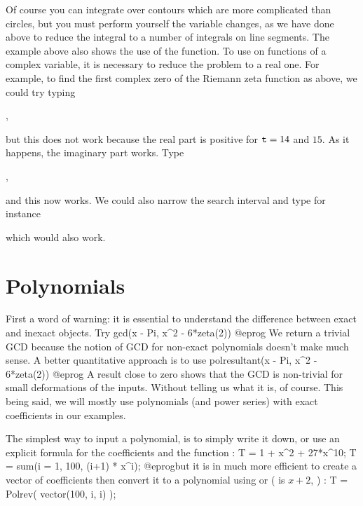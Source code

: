 Of course you can integrate over contours which are more complicated than
circles, but you must perform yourself the variable changes, as we have done
above to reduce the integral to a number of integrals on line segments.
\smallskip
%
The example above also shows the use of the  function. To use
 on functions of a complex variable, it is necessary to reduce the
problem to a real one. For example, to find the first complex zero of the
Riemann zeta function as above, we could try typing

,

\noindent but this does not work because the real part is positive for
${\tt t}=14$ and $15$. As it happens, the imaginary part works. Type

,

\noindent and this now works. We could also narrow the search interval and
type for instance


\noindent which would also work.

\section{Polynomials}

First a word of warning: it is essential to understand the difference between
exact and inexact objects. Try
\bprog
  gcd(x - Pi, x^2 - 6*zeta(2))
@eprog\noindent
We return a trivial GCD because the notion of GCD for non-exact polynomials
doesn't make much sense. A better quantitative approach is to use
\bprog
  polresultant(x - Pi, x^2 - 6*zeta(2))
@eprog\noindent
A result close to zero shows that the GCD is non-trivial for small
deformations of the inputs. Without telling us what it is, of course. This
being said, we will mostly use polynomials (and power series) with exact
coefficients in our examples.\smallskip

The simplest way to input a polynomial, is to simply write it down,
or use an explicit formula for the coefficients and the function :
\bprog
  T = 1 + x^2 + 27*x^10;
  T = sum(i = 1, 100, (i+1) * x^i);
@eprog\noindent but it is in much more efficient to create a vector of
coefficients then convert it to a polynomial using  or 
( is $x+2$, ) :
\bprog
  T = Polrev( vector(100, i, i) );

